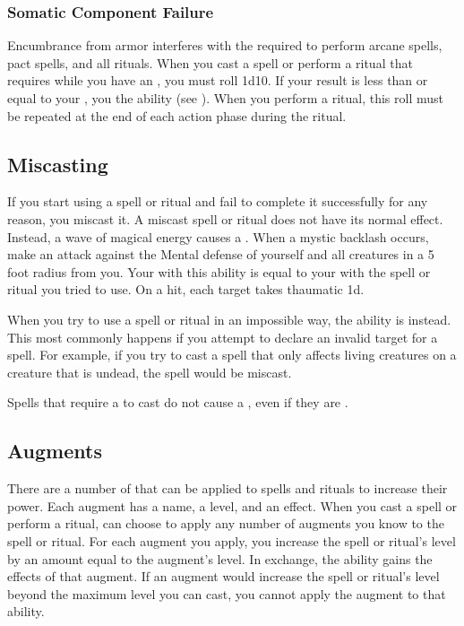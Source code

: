         \subsubsection{Somatic Component Failure}\label{Somatic Component Failure}
            Encumbrance from armor interferes with the  required to perform arcane spells, pact spells, and all rituals.
            When you cast a spell or perform a ritual that requires  while you have an , you must roll 1d10.
            If your result is less than or equal to your , you  the ability (see ).
            When you perform a ritual, this roll must be repeated at the end of each action phase during the ritual.

    \subsection{Miscasting}\label{Miscasting}

        If you start using a spell or ritual and fail to complete it successfully for any reason, you miscast it.
        A miscast spell or ritual does not have its normal effect.
        Instead, a wave of magical energy causes a .
        When a mystic backlash occurs, make an attack against the Mental defense of yourself and all creatures in a 5 foot radius from you.
        Your  with this ability is equal to your  with the spell or ritual you tried to use.
        On a hit, each target takes thaumatic  \minus1d.

         When you try to use a spell or ritual in an impossible way, the ability is  instead.
        This most commonly happens if you attempt to declare an invalid target for a spell.
        For example, if you try to cast a spell that only affects living creatures on a creature that is undead, the spell would be miscast.

         Spells that require a  to cast do not cause a , even if they are .

    \subsection{Augments}\label{Augments}
        There are a number of  that can be applied to spells and rituals to increase their power.
        Each augment has a name, a level, and an effect.
        When you cast a spell or perform a ritual, can choose to apply any number of augments you know to the spell or ritual.
        For each augment you apply, you increase the spell or ritual's level by an amount equal to the augment's level.
        In exchange, the ability gains the effects of that augment.
        If an augment would increase the spell or ritual's level beyond the maximum level you can cast, you cannot apply the augment to that ability.

